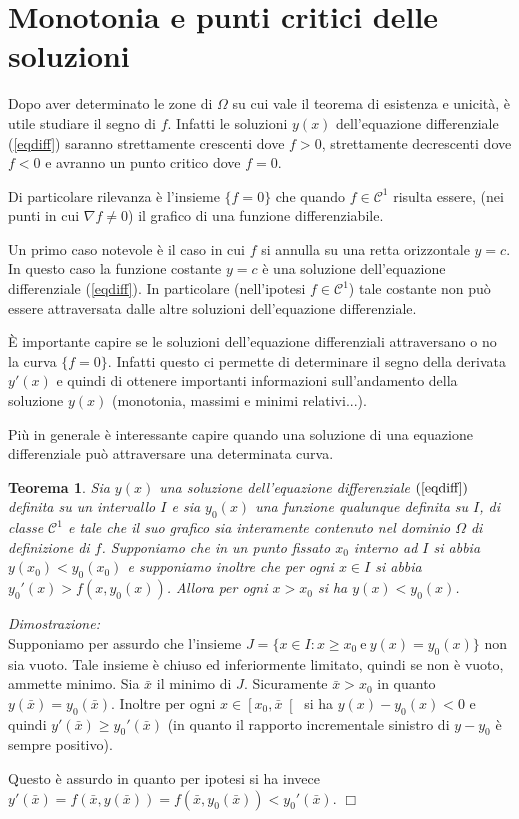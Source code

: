 \documentclass[italian,a4paper]{article}
\newcommand{\CC}{\mathcal{C}}
\newtheorem{theorem}{Teorema}[section]
\def\profname{Dimostrazione}
\newenvironment{proof}
        {%
                {}%
                {%
                }%
        \noindent%
        {\it \profname:}\\%
        }%
        {%
        \hfill $\Box$%
        }
\begin{document}
\section{Monotonia e punti critici delle soluzioni}

Dopo aver determinato le zone di $\Omega$ su cui vale il teorema di
esistenza e unicit\`a, \`e utile studiare il segno di $f$. Infatti 
le soluzioni $y(x)$ dell'equazione differenziale (\ref{eqdiff})
saranno strettamente crescenti dove $f>0$, strettamente decrescenti
dove $f<0$ e avranno un punto critico dove $f=0$.

Di particolare rilevanza \`e l'insieme $\{f=0\}$ che quando
$f\in\CC^1$ risulta essere, (nei punti in cui $\nabla f \neq 0$)
il grafico di una funzione differenziabile.

Un primo caso notevole \`e il caso in cui $f$ si annulla su una 
retta orizzontale $y=c$. In questo caso la funzione costante $y=c$ \`e una
soluzione dell'equazione differenziale (\ref{eqdiff}). 
In particolare
(nell'ipotesi $f\in\CC^1$) tale costante non pu\`o essere
attraversata dalle altre soluzioni dell'equazione differenziale.

\`E importante capire se le soluzioni dell'equazione differenziali
attraversano o no la curva $\{f=0\}$. Infatti questo ci permette di
determinare il segno della derivata $y'(x)$ e quindi di ottenere
importanti informazioni sull'andamento della soluzione $y(x)$
(monotonia, massimi e minimi relativi...).

Pi\`u in generale \`e interessante capire quando una soluzione di una
equazione differenziale pu\`o attraversare una determinata curva.

\begin{theorem}\label{nonpassa}
Sia $y(x)$ una soluzione dell'equazione differenziale $(\ref{eqdiff})$
definita su un intervallo $I$ e sia $y_0(x)$ una funzione qualunque
definita su $I$, di classe $\CC^1$ e tale che il suo grafico sia
interamente contenuto nel dominio $\Omega$ di definizione di $f$.
Supponiamo che in un punto fissato $x_0$ interno ad $I$ si abbia
$y(x_0)<y_0(x_0)$ e supponiamo inoltre che per ogni $x\in I$ si abbia
$y_0'(x)>f(x,y_0(x))$. Allora per ogni $x>x_0$ si ha $y(x)<y_0(x)$.
\end{theorem}

\begin{proof}
Supponiamo per assurdo che l'insieme $J=\{x\in I: x\ge x_0\
\mathrm{e}\ y(x)=y_0(x)\}$ non sia vuoto. Tale insieme \`e chiuso ed
inferiormente limitato, quindi se non \`e vuoto, ammette minimo. Sia
$\bar x$ il minimo di $J$. Sicuramente $\bar x>x_0$ in quanto $y(\bar
x)=y_0(\bar x)$. Inoltre per ogni $x\in \left[x_0,\bar x\right[$ si ha
$y(x)-y_0(x)<0$ e quindi $y'(\bar x) \ge y_0'(\bar x)$ (in quanto 
il rapporto incrementale sinistro di $y-y_0$ \`e sempre positivo).

Questo \`e assurdo in quanto per ipotesi si ha invece $y'(\bar x) =
f(\bar x, y(\bar x)) = f(\bar x ,y_0(\bar x)) < y_0'(\bar x)$.
\end{proof}
\end{document}
